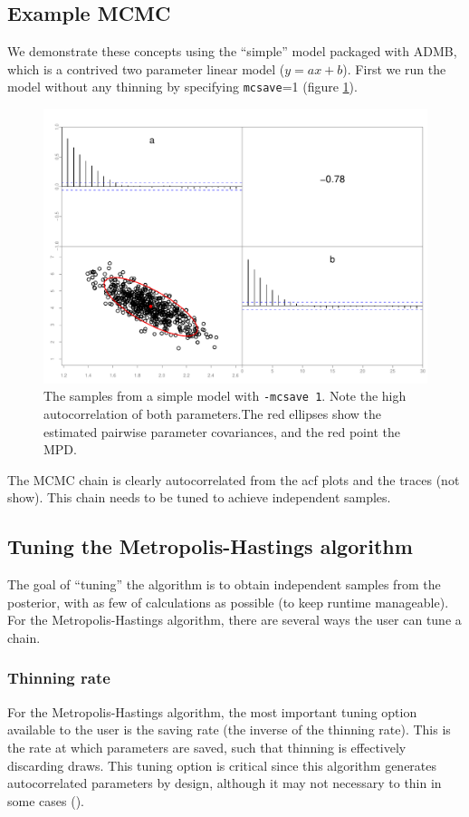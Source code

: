 \documentclass{article}\usepackage[]{graphicx}\usepackage[]{color}
\begin{document}
\subsection{Example MCMC}
We demonstrate these concepts using the ``simple'' model
packaged with ADMB, which is a contrived two parameter
linear model ($y=ax+b$). First we run the model without any
thinning by specifying \texttt{mcsave}=1 (figure
\ref{fig:simple1}).
\begin{figure}[h]
  \centering
  \includegraphics[width=5in]{../plots/simple1.pdf}
  \caption{The samples from a simple model with
    \texttt{-mcsave 1}. Note the high autocorrelation of
    both parameters.The red ellipses show the estimated
    pairwise parameter covariances, and the red point the
    MPD.}
  \label{fig:simple1}
\end{figure}
The MCMC chain is clearly autocorrelated from the acf plots
and the traces (not show). This chain needs to be tuned to
achieve independent samples.
\subsection{Tuning the Metropolis-Hastings algorithm}\label{sec:MHtuning}
The goal of ``tuning'' the algorithm is to obtain
independent samples from the posterior, with as few of
calculations as possible (to keep runtime manageable). For
the Metropolis-Hastings algorithm, there are several ways the user can tune a chain.

\subsubsection{Thinning rate}
For the Metropolis-Hastings algorithm, the most important tuning
option available to the user is the saving rate (the inverse of
the thinning rate). This is the rate at which parameters are
saved, such that thinning is effectively discarding draws. This
tuning option is critical since this algorithm generates
autocorrelated parameters by design, although it may not
necessary to thin in some cases (\cite{link2012}).
\end{document}
